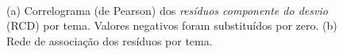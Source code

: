 \documentclass[a4paper]{report}
\begin{document}
\begin{figure} 
    \centering
  \\
\caption{(a) Correlograma (de Pearson) dos \emph{resíduos componente do desvio} (RCD) por tema. Valores negativos foram substituídos por zero. (b) Rede de associação dos resíduos por tema.}
\label{fig:Correlacao}
\end{figure}
\end{document}
